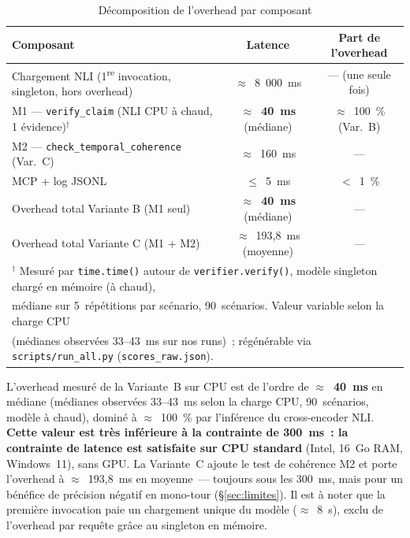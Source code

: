 \documentclass[12pt,a4paper]{article}
\begin{document}
\begin{table}[H]
\centering
\caption{Décomposition de l'overhead par composant}
\label{tab:latency}
\begin{tabular}{lcc}
\toprule
\textbf{Composant} & \textbf{Latence} & \textbf{Part de l'overhead} \\
\midrule
Chargement NLI (1\textsuperscript{re} invocation, singleton, hors overhead) & $\approx$~8~000~ms & --- (une seule fois) \\
M1 --- \texttt{verify\_claim} (NLI CPU à chaud, 1 évidence)$^\dagger$ & \textbf{$\approx$~40~ms} (médiane) & $\approx$~100~\% (Var.~B) \\
M2 --- \texttt{check\_temporal\_coherence} (Var.~C) & $\approx$~160~ms & --- \\
MCP + log JSONL & $\leq$~5~ms & $<$~1~\% \\
\midrule
Overhead total Variante B (M1 seul) & \textbf{$\approx$~40~ms} (médiane) & --- \\
Overhead total Variante C (M1 + M2) & $\approx$~193,8~ms (moyenne) & --- \\
\bottomrule
\multicolumn{3}{l}{\small $^\dagger$ Mesuré par \texttt{time.time()} autour de \texttt{verifier.verify()}, modèle singleton chargé en mémoire (à chaud),} \\
\multicolumn{3}{l}{\small \hspace{1em} médiane sur 5~répétitions par scénario, 90~scénarios. Valeur variable selon la charge CPU} \\
\multicolumn{3}{l}{\small \hspace{1em} (médianes observées 33--43~ms sur nos runs)~; régénérable via \texttt{scripts/run\_all.py} (\texttt{scores\_raw.json}).} \\
\end{tabular}
\end{table}

L'overhead mesuré de la Variante~B sur CPU est de l'ordre de \textbf{$\approx$~40~ms} en médiane (médianes observées 33--43~ms selon la charge CPU, 90~scénarios, modèle à chaud), dominé à $\approx$~100~\% par l'inférence du cross-encoder NLI. \textbf{Cette valeur est très inférieure à la contrainte de 300~ms~: la contrainte de latence est satisfaite sur CPU standard} (Intel, 16~Go RAM, Windows~11), sans GPU. La Variante~C ajoute le test de cohérence M2 et porte l'overhead à $\approx$~193,8~ms en moyenne~--- toujours sous les 300~ms, mais pour un bénéfice de précision négatif en mono-tour (§\ref{sec:limites}). Il est à noter que la première invocation paie un chargement unique du modèle ($\approx$~8~s), exclu de l'overhead par requête grâce au singleton en mémoire.
\end{document}
